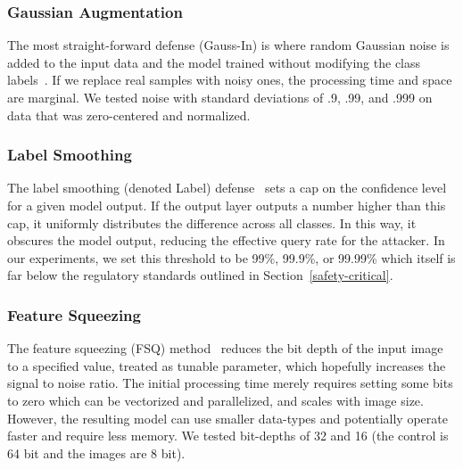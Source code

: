 \documentclass[journal]{IEEEtran}
\newcommand{\tl}[1]{\textit{[{\color{red}#1}]}}
\begin{document}
\subsubsection{Gaussian Augmentation}
The most straight-forward defense (Gauss-In) is where random Gaussian noise is added to the input data and the model trained without modifying the class labels~\cite{gauss_aug}. If we replace real samples with noisy ones, the processing time and space are marginal. We tested noise with standard deviations of .9, .99, and .999 on data that was zero-centered and normalized.








\subsubsection{Label Smoothing}
The label smoothing (denoted Label) defense~\cite{label_smoothing} sets a cap on the confidence level for a given model output. If the output layer outputs a number higher than this cap, it uniformly distributes the difference across all classes. In this way, it obscures the model output, reducing the effective query rate for the attacker. In our experiments, we set this threshold to be 99\%,  99.9\%,  or 99.99\% which itself is far below the regulatory standards outlined in Section~\ref{safety-critical}. 



\subsubsection{Feature Squeezing}
The feature squeezing (FSQ) method~\cite{feature_squeezing} reduces the bit depth of the input image to a specified value, treated as tunable parameter, which hopefully increases the signal to noise ratio. The initial processing time merely requires setting some bits to zero which can be vectorized and parallelized, and scales with image size. However, the resulting model can use smaller data-types and potentially operate faster and require less memory. We tested bit-depths of 32 and 16 (the control is 64 bit and the images are 8 bit). 
\end{document}
